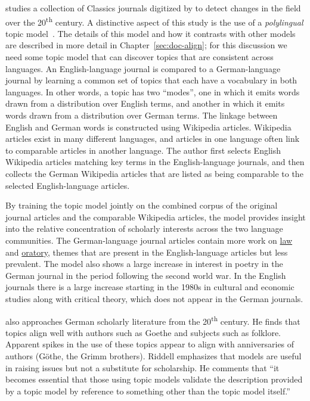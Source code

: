 \citet{mimno-12b} studies a collection of Classics journals digitized by  to detect changes in the field over the 20\textsuperscript{th} century.
A distinctive aspect of this study is the use of a {\em polylingual} topic model~\citep{mimno-09}.  The details of this model and how it contrasts with other models are described in more detail in Chapter~\ref{sec:doc-align}; for this discussion we need some topic model that can discover topics that are consistent across languages.
An English-language journal is compared to a German-language journal by learning a common set of topics that each have a vocabulary in both languages.
In other words, a topic has two ``modes'', one in which it emits words drawn from a distribution over English terms, and another in which it emits words drawn from a distribution over German terms.
The linkage between English and German words is constructed using Wikipedia articles.
Wikipedia articles exist in many different languages, and articles in one language often link to comparable articles in another language.
The author first selects English Wikipedia articles matching key terms in the English-language journals, and then collects the German Wikipedia articles that are listed as being comparable to the selected English-language articles.

By training the topic model jointly on the combined corpus of the original journal articles and the comparable Wikipedia articles, the model provides insight into the relative concentration of scholarly interests across the two language communities.
The German-language journal articles contain more work on \underline{law} and \underline{oratory}, themes that are present in the English-language articles but less prevalent.
The model also shows a large increase in  interest in poetry in the German journal in the period following the second world war.
In the English journals there is a large increase starting in the 1980s in cultural and economic studies along with critical theory, which does not appear in the German journals.

\citet{riddell-12} also approaches German scholarly literature from the 20\textsuperscript{th} century. He finds that topics align well with authors such as Goethe and subjects such as folklore. Apparent spikes in the use of these topics appear to align with anniversaries of authors (G\"othe, the Grimm brothers).
Riddell emphasizes that models are useful in raising issues but not a substitute for scholarship.
He comments that ``it becomes essential that those using topic models validate the description provided by a topic model by reference to something other than the topic model itself.''

